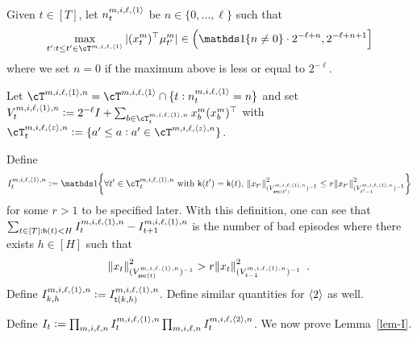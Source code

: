 Given $t \in [T]$, let $n_t^{m,i,\ell,{\langle}1{\rangle}}$ be $n \in \{0,\ldots,\ell\} $ such that
\begin{align*}
  \max_{t':t \le t'\in \cT^{m,i,\ell,\la1\ra}} |(x^m_{t})^\T\mu^m_{t'}| \in \lt\lparen \onec{n \neq 0} \cd 2^{-\ell+n}, 2^{-\ell+n+1}  \rt\rbrack 
\end{align*}
where we set $n=0$ if the maximum above is less or equal to $2^{-\ell}$.

Let $\blue{\cT^{m,i,\ell,\la1\ra,n}} = \cT^{m,i,\ell,\la1\ra} \cap \{t: n_t^{m,i,\ell,\la1\ra} = n\}$ and
set $\blue{V^{m,i,\ell,\la1\ra,n}_{t}} := 2^{-\ell}I + \sum_{b \in \cT^{m,i,\ell,\la1\ra,n}_{t}} x^m_{b}  (x^m_{b})^\T$ with $\blue{\cT_t^{m,i,\ell,\la z \ra,n}} :=\{a'\le a:a'\in \cT^{m,i,\ell,\la z \ra,n}\}$.

Define
\begin{align*}
    \blue{I^{m,i,\ell,\la1\ra,n}_{t}} := \onec{\forall t'\in \cT^{m,i,\ell,\la1\ra,n}_{t} \text{ with } \sfk(t')=\sfk(t),~   \norm{x_{t'}}^2_{(V^{m,i,\ell,\la1\ra,n}_{\anc(t')})^{-1}} \le r \norm{x_{t'}}^2_{(V^{m,i,\ell,\la1\ra,n}_{t'-1})^{-1}}  }
\end{align*}
for some $r>1$ to be specified later.
With this definition, one can see that $\sum_{t\in[T]: \mathsf{h}(t) < H}  I^{m,i,\ell,{\langle}1{\rangle},n}_{t}-I^{m,i,\ell,{\langle}1{\rangle},n}_{t+1}$ is the number of bad episodes where there exists $h\in[H]$ such that 
\begin{align*}
 \norm{x_{t}}^2_{(V^{m,i,\ell,{\langle}1{\rangle},n}_{\operatorname{\mathsf{anc}}(t)})^{-1}} > r \norm{x_t}^2_{(V^{m,i,\ell,{\langle}1{\rangle},n}_{t-1})^{-1}}~.
\end{align*}
Define $I^{m,i,\ell,{\langle}1{\rangle},n}_{k,h} := I^{m,i,\ell,{\langle}1{\rangle},n}_{\mathsf{t}(k,h)}$.
Define similar quantities for ${\langle}2{\rangle}$ as well.

Define $I_{t} := \prod_{m,i,\ell,n} I^{m,i,\ell,{\langle}1{\rangle},n}_{t} \prod_{m,i,\ell,n} I^{m,i,\ell,{\langle}2{\rangle},n}_{t}$.
We now prove Lemma~\ref{lem-I}.

